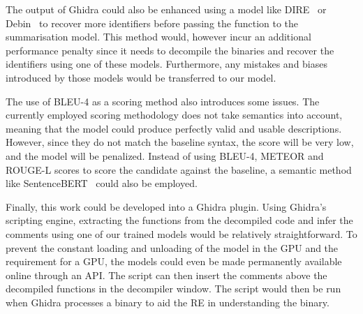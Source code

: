 The output of Ghidra could also be enhanced using a model like DIRE~\cite{Dire} or Debin~\cite{Debin} to recover more identifiers before passing the function to the summarisation model. This method would, however incur an additional performance penalty since it needs to decompile the binaries and recover the identifiers using one of these models. Furthermore, any mistakes and biases introduced by those models would be transferred to our model.


The use of BLEU-4 as a scoring method also introduces some issues. The currently employed scoring methodology does not take semantics into account, meaning that the model could produce perfectly valid and usable descriptions. However, since they do not match the baseline syntax, the score will be very low, and the model will be penalized. Instead of using BLEU-4, METEOR and ROUGE-L scores to score the candidate against the baseline, a semantic method like SentenceBERT~\cite{SentenceBERT} could also be employed.

Finally, this work could be developed into a Ghidra plugin. Using Ghidra's scripting engine, extracting the functions from the decompiled code and infer the comments using one of our trained models would be relatively straightforward. To prevent the constant loading and unloading of the model in the GPU and the requirement for a GPU, the models could even be made permanently available online through an API. The script can then insert the comments above the decompiled functions in the decompiler window. The script would then be run when Ghidra processes a binary to aid the RE in understanding the binary.
